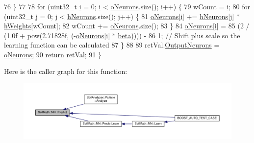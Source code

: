 \begin{DoxyCode}
76   \}
77 
78   \textcolor{keywordflow}{for} (uint32\_t \hyperlink{_comparision_pictures_2_createtest_image_8m_a6f6ccfcf58b31cb6412107d9d5281426}{i} = 0; \hyperlink{_comparision_pictures_2_createtest_image_8m_a6f6ccfcf58b31cb6412107d9d5281426}{i} < \hyperlink{class_soil_math_1_1_n_n_a50a52b41982f6845dc5294f17607774b}{oNeurons}.size(); \hyperlink{_comparision_pictures_2_createtest_image_8m_a6f6ccfcf58b31cb6412107d9d5281426}{i}++) \{
79     wCount = \hyperlink{_comparision_pictures_2_createtest_image_8m_a6f6ccfcf58b31cb6412107d9d5281426}{i};
80     \textcolor{keywordflow}{for} (uint32\_t \hyperlink{_comparision_pictures_2_createtest_image_8m_ac86694252f8dfdb19aaeadc4b7c342c6}{j} = 0; \hyperlink{_comparision_pictures_2_createtest_image_8m_ac86694252f8dfdb19aaeadc4b7c342c6}{j} < \hyperlink{class_soil_math_1_1_n_n_a459bde01ce33e0b27803cbe4a3b114b4}{hNeurons}.size(); \hyperlink{_comparision_pictures_2_createtest_image_8m_ac86694252f8dfdb19aaeadc4b7c342c6}{j}++) \{
81       \hyperlink{class_soil_math_1_1_n_n_a50a52b41982f6845dc5294f17607774b}{oNeurons}[\hyperlink{_comparision_pictures_2_createtest_image_8m_a6f6ccfcf58b31cb6412107d9d5281426}{i}] += \hyperlink{class_soil_math_1_1_n_n_a459bde01ce33e0b27803cbe4a3b114b4}{hNeurons}[\hyperlink{_comparision_pictures_2_createtest_image_8m_ac86694252f8dfdb19aaeadc4b7c342c6}{j}] * \hyperlink{class_soil_math_1_1_n_n_a46db1b2814215509a7345fccc8928efe}{hWeights}[wCount];
82       wCount += \hyperlink{class_soil_math_1_1_n_n_a50a52b41982f6845dc5294f17607774b}{oNeurons}.size();
83     \}
84     \hyperlink{class_soil_math_1_1_n_n_a50a52b41982f6845dc5294f17607774b}{oNeurons}[\hyperlink{_comparision_pictures_2_createtest_image_8m_a6f6ccfcf58b31cb6412107d9d5281426}{i}] =
85         (2 / (1.0f + pow(2.71828f, (-\hyperlink{class_soil_math_1_1_n_n_a50a52b41982f6845dc5294f17607774b}{oNeurons}[\hyperlink{_comparision_pictures_2_createtest_image_8m_a6f6ccfcf58b31cb6412107d9d5281426}{i}] * \hyperlink{class_soil_math_1_1_n_n_a4bb773955d78fa6f064b39a9149b78c8}{beta})))) -
86         1; \textcolor{comment}{// Shift plus scale so the learning function can be calculated}
87   \}
88 
89   retVal.\hyperlink{struct_predict__struct_aa0708cae93baa061f21452537e86d3bd}{OutputNeurons} = \hyperlink{class_soil_math_1_1_n_n_a50a52b41982f6845dc5294f17607774b}{oNeurons};
90   \textcolor{keywordflow}{return} retVal;
91 \}
\end{DoxyCode}


Here is the caller graph for this function\+:\nopagebreak
\begin{figure}[H]
\begin{center}
\leavevmode
\includegraphics[width=350pt]{class_soil_math_1_1_n_n_aa7f23fcdb8383a74586c9c30b8bc0af7_icgraph}
\end{center}
\end{figure}


